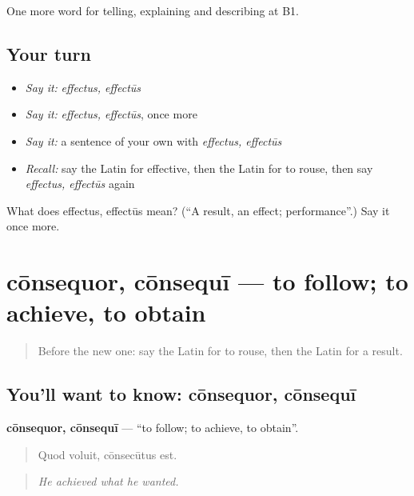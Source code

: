 \begin{grammarlens}[title={What you've built}]
One more word for telling, explaining and describing at B1.
\end{grammarlens}

\subsection*{Your turn}
\begin{itemize}
\raggedright
  \item \emph{Say it:} \emph{effectus, effectūs}
  \item \emph{Say it:} \emph{effectus, effectūs}, once more
  \item \emph{Say it:} a sentence of your own with \emph{effectus, effectūs}
  \item \emph{Recall:} say the Latin for effective, then the Latin for to rouse, then say \emph{effectus, effectūs} again
\end{itemize}

\begin{tcolorbox}[breakable,colback=teal!4,colframe=teal!35!black,title={Before you move on}]
What does effectus, effectūs mean? (\textquotedblleft{}A result, an effect; performance\textquotedblright{}.) Say it once more.
\end{tcolorbox}
\section[cōnsequor, cōnsequī]{cōnsequor, cōnsequī — to follow; to achieve, to obtain}

\label{lesson:LA-C373-consequor}



\begin{quote}
Before the new one: say the Latin for to rouse, then the Latin for a result.
\end{quote}

\subsection*{You'll want to know: cōnsequor, cōnsequī}
\textbf{cōnsequor, cōnsequī} — \textquotedblleft{}to follow; to achieve, to obtain\textquotedblright{}.

\begin{quote}
Quod voluit, cōnsecūtus est.
\end{quote}

\begin{quote}
\emph{He achieved what he wanted.}
\end{quote}

